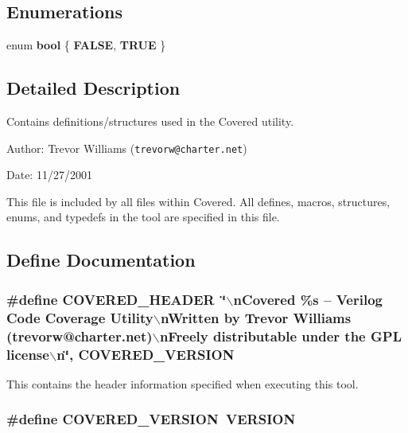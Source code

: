 \subsection*{Enumerations}
\begin{CompactItemize}
\item 
enum {\bf bool} \{ {\bf FALSE}, 
{\bf TRUE}
 \}
\end{CompactItemize}


\subsection{Detailed Description}
Contains definitions/structures used in the Covered utility. 

\begin{Desc}
\item[Author:]Trevor Williams ({\tt trevorw@charter.net}) \end{Desc}
\begin{Desc}
\item[Date:]11/27/2001 \end{Desc}
\begin{Desc}
\item[]This file is included by all files within Covered. All defines, macros, structures, enums, and typedefs in the tool are specified in this file.\end{Desc}


\subsection{Define Documentation}
\subsubsection{\setlength{\rightskip}{0pt plus 5cm}\#define COVERED\_\-HEADER\ \char`\"{}$\backslash$n\-Covered \%s -- Verilog Code Coverage Utility$\backslash$n\-Written by Trevor Williams  (trevorw@charter.net)$\backslash$n\-Freely distributable under the GPL license$\backslash$n\char`\"{}, COVERED\_\-VERSION}\label{defines_8h_a1}


This contains the header information specified when executing this tool. 
\subsubsection{\setlength{\rightskip}{0pt plus 5cm}\#define COVERED\_\-VERSION\ VERSION}\label{defines_8h_a0}


